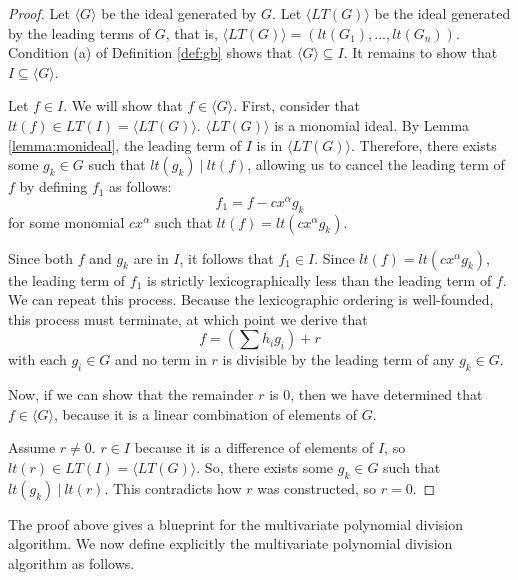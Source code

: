 \documentclass{msthesis}
\theoremstyle{definition}
\begin{document}
\begin{proof}
    Let $\langle G \rangle$ be the ideal generated by $G$. Let $\langle LT(G) \rangle$ be the ideal generated by the leading terms of $G$, that is, 
    $\langle LT(G) \rangle = (lt(G_1), ...,lt(G_n))$.
    Condition (a) of Definition \ref{def:gb} shows that $\langle G \rangle \subseteq I$.  It remains to show that $I \subseteq \langle G \rangle$.

    Let $f \in I$.  We will show that $f \in \langle G \rangle$.  First, consider that $lt(f) \in LT(I) = \langle LT(G) \rangle$.  $\langle LT(G) \rangle$ is a monomial ideal.  By Lemma \ref{lemma:monideal}, the leading term of $I$ is in $\langle LT(G) \rangle$.  Therefore, there exists some $g_k \in G$ such that $lt(g_k)\ |\ lt(f)$, allowing us to cancel the leading term of $f$ by defining $f_1$ as follows:
    \[ f_1 = f - cx^\alpha g_k\]
    for some monomial $cx^\alpha$ such that $lt(f) = lt(cx^\alpha g_k)$.

    Since both $f$ and $g_k$ are in $I$, it follows that $f_1 \in I$.  Since $lt(f) = lt(cx^\alpha g_k)$, the leading term of $f_1$ is strictly lexicographically less than the leading term of $f$.  We can repeat this process.  Because the lexicographic ordering is well-founded, this process must terminate, at which point we derive that
    \[ f = (\sum h_ig_i) + r\]
    with each $g_i \in G$ and no term in $r$ is divisible by the leading term of any $g_k \in G$.

    Now, if we can show that the remainder $r$ is $0$, then we have determined that $f \in \langle G \rangle$, because it is a linear combination of elements of $G$.

    Assume $r \neq 0$.  $r \in I$ because it is a difference of elements of $I$, so $lt(r) \in LT(I) = \langle LT(G) \rangle$. So, there exists some $g_k \in G$ such that $lt(g_k)\ |\ lt(r)$.  This contradicts how $r$ was constructed, so $r = 0$.
\end{proof}

The proof above gives a blueprint for the multivariate polynomial division algorithm. We now define explicitly the multivariate polynomial division algorithm as follows.
\end{document}
